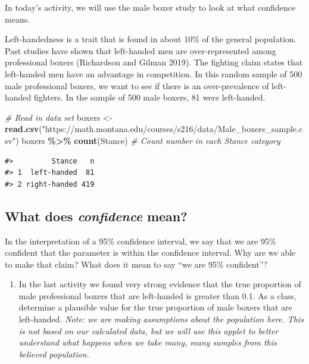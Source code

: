 \documentclass[
]{report}
\newenvironment{Shaded}{\begin{snugshade}}{\end{snugshade}}
\newcommand{\CommentTok}[1]{\textcolor[rgb]{0.56,0.35,0.01}{\textit{#1}}}
\newcommand{\FunctionTok}[1]{\textcolor[rgb]{0.13,0.29,0.53}{\textbf{#1}}}
\newcommand{\NormalTok}[1]{#1}
\newcommand{\OtherTok}[1]{\textcolor[rgb]{0.56,0.35,0.01}{#1}}
\newcommand{\SpecialCharTok}[1]{\textcolor[rgb]{0.81,0.36,0.00}{\textbf{#1}}}
\newcommand{\StringTok}[1]{\textcolor[rgb]{0.31,0.60,0.02}{#1}}
\providecommand{\tightlist}{%
  \setlength{\itemsep}{0pt}\setlength{\parskip}{0pt}}
\begin{document}
In today's activity, we will use the male boxer study to look at what confidence means.

Left-handedness is a trait that is found in about 10\% of the general population. Past studies have shown that left-handed men are over-represented among professional boxers (Richardson and Gilman 2019). The fighting claim states that left-handed men have an advantage in competition. In this random sample of 500 male professional boxers, we want to see if there is an over-prevalence of left-handed fighters. In the sample of 500 male boxers, 81 were left-handed.

\begin{Shaded}
\begin{Highlighting}[]
 \CommentTok{\# Read in data set}
\NormalTok{boxers }\OtherTok{\textless{}{-}} \FunctionTok{read.csv}\NormalTok{(}\StringTok{"https://math.montana.edu/courses/s216/data/Male\_boxers\_sample.csv"}\NormalTok{)}
\NormalTok{boxers }\SpecialCharTok{\%\textgreater{}\%} \FunctionTok{count}\NormalTok{(Stance)  }\CommentTok{\# Count number in each Stance category}
\end{Highlighting}
\end{Shaded}

\begin{verbatim}
#>         Stance   n
#> 1  left-handed  81
#> 2 right-handed 419
\end{verbatim}

\subsection*{\texorpdfstring{What does \emph{confidence} mean?}{What does confidence mean?}}\label{what-does-confidence-mean}

In the interpretation of a 95\% confidence interval, we say that we are 95\% confident that the parameter is within the confidence interval. Why are we able to make that claim? What does it mean to say ``we are 95\% confident''?

\begin{enumerate}
\def\labelenumi{\arabic{enumi}.}
\tightlist
\item
  In the last activity we found very strong evidence that the true proportion of male professional boxers that are left-handed is greater than 0.1. As a class, determine a plausible value for the true proportion of male boxers that are left-handed. \emph{Note: we are making assumptions about the population here. This is not based on our calculated data, but we will use this applet to better understand what happens when we take many, many samples from this believed population.}
\end{enumerate}
\end{document}
